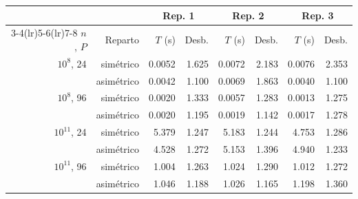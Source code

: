 \begin{center}\small
\begin{tabular}{rrrrrrrr}
\toprule
 & & \multicolumn{2}{c}{Rep. 1} & \multicolumn{2}{c}{Rep. 2} & \multicolumn{2}{c}{Rep. 3} \\
\cmidrule(lr){3-4}\cmidrule(lr){5-6}\cmidrule(lr){7-8}
$n$, $P$ & Reparto & $T$ (s) & Desb. & $T$ (s) & Desb. & $T$ (s) & Desb. \\
\midrule
$10^{8}$, 24 & simétrico & 0.0052 & 1.625 & 0.0072 & 2.183 & 0.0076 & 2.353 \\
 & asimétrico & 0.0042 & 1.100 & 0.0069 & 1.863 & 0.0040 & 1.100 \\
\addlinespace[2pt]
$10^{8}$, 96 & simétrico & 0.0020 & 1.333 & 0.0057 & 1.283 & 0.0013 & 1.275 \\
 & asimétrico & 0.0020 & 1.195 & 0.0019 & 1.142 & 0.0017 & 1.278 \\
\addlinespace[2pt]
$10^{11}$, 24 & simétrico & 5.379 & 1.247 & 5.183 & 1.244 & 4.753 & 1.286 \\
 & asimétrico & 4.528 & 1.272 & 5.153 & 1.396 & 4.940 & 1.233 \\
\addlinespace[2pt]
$10^{11}$, 96 & simétrico & 1.004 & 1.263 & 1.024 & 1.290 & 1.012 & 1.272 \\
 & asimétrico & 1.046 & 1.188 & 1.026 & 1.165 & 1.198 & 1.360 \\
\bottomrule
\end{tabular}
\end{center}
